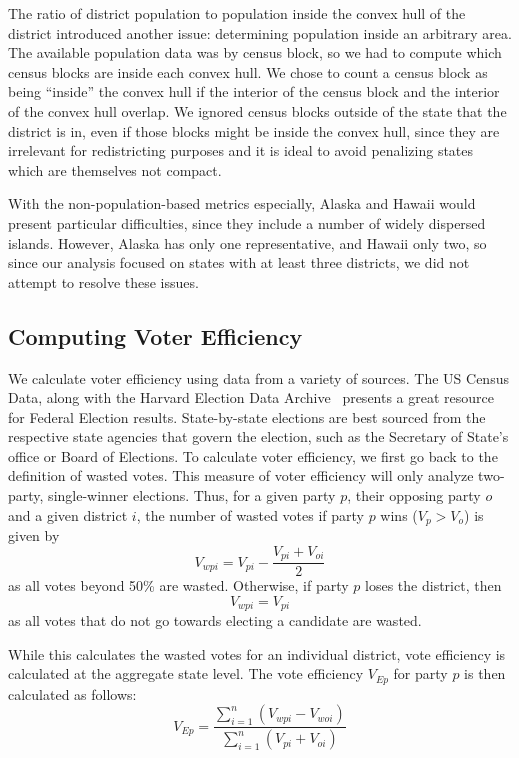 \documentclass[12pt]{article}
\begin{document}
  The ratio of district population to population inside the convex hull of the district introduced another issue: determining population inside an arbitrary area. The available population data was by census block, so we had to compute which census blocks are inside each convex hull. We chose to count a census block as being ``inside'' the convex hull if the interior of the census block and the interior of the convex hull overlap. We ignored census blocks outside of the state that the district is in, even if those blocks might be inside the convex hull, since they are irrelevant for redistricting purposes and it is ideal to avoid penalizing states which are themselves not compact.


  With the non-population-based metrics especially, Alaska and Hawaii would present particular difficulties, since they include a number of widely dispersed islands.  However, Alaska has only one representative, and Hawaii only two, so since our analysis focused on states with at least three districts, we did not attempt to resolve these issues.

  \subsection {Computing Voter Efficiency}
  We calculate voter efficiency using data from a variety of sources.  The US Census Data, along with the Harvard Election Data Archive~\cite{heda} presents a great resource for Federal Election results.  State-by-state elections are best sourced from the respective state agencies that govern the election, such as the Secretary of State's office or Board of Elections.  To calculate voter efficiency, we first go back to the definition of wasted votes.  This measure of voter efficiency will only analyze two-party, single-winner elections.  Thus, for a given party $p$, their opposing party $o$ and a given district $i$, the number of wasted votes  if party $p$ wins ($V_{p} > V_{o}$)  is given by
    \[ V_{wpi} = V_{pi} - \frac{V_{pi}+V_{oi}}{2}\]
  as all votes beyond 50\% are wasted. Otherwise, if party $p$ loses the district, then
    \[V_{wpi} = V_{pi}\]
  as all votes that do not go towards electing a candidate are wasted.

    While this calculates the wasted votes for an individual district, vote efficiency is calculated at the aggregate state level.  The vote efficiency $V_{Ep}$ for party $p$ is then calculated as follows:
     \[V_{Ep} = \frac{\sum_{i=1}^{n}\left(V_{wpi}-V_{woi}\right)}{\sum_{i=1}^{n}\left(V_{pi}+V_{oi}\right)}\]
\end{document}
